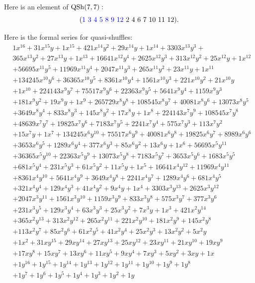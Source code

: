 \begin{Eg}
	Here is an element of $\operatorname{QSh}(7,7):$
	\[
	({\color{blue}1~3~4~5~8~9~12}~2~4~6~7~10~11~12).
	\]
\end{Eg}
Here is the formal series for quasi-shuffles:
\begin{align*}
	&1x^{16} + 31x^{15}y + 1x^{15} + 421x^{14}y^2 + 29x^{14}y + 1x^{14} + 3303x^{13}y^3 + \\
	 &365x^{13}y^2 + 27x^{13}y + 1x^{13} + 16641x^{12}y^4 + 2625x^{12}y^3 + 313x^{12}y^2 + 25x^{12}y + 1x^{12} \\
	  &+ 56695x^{11}y^5 +  11969x^{11}y^4 + 2047x^{11}y^3 + 265x^{11}y^2 + 23x^{11}y + 1x^{11} \\
	  &+ 134245x^{10}y^6 + 36365x^{10}y^5 + 8361x^{10}y^4 + 1561x^{10}y^3 + 221x^{10}y^2 + 21x^{10}y \\
	   &+ 1x^{10} + 224143x^9y^7 + 75517x^9y^6 + 22363x^9y^5 + 5641x^9y^4 + 1159x^9y^3 \\
	   &+ 181x^9y^2 + 19x^9y + 1x^9 + 265729x^8y^8 + 108545x^8y^7 + 40081x^8y^6 + 13073x^8y^5 \\ 
	   &+ 3649x^8y^4 + 833x^8y^3 + 145x^8y^2 + 17x^8y + 1x^8 + 224143x^7y^9 + 108545x^7y^8 \\ 
	   &+ 48639x^7y^7 + 19825x^7y^6 + 7183x^7y^5 + 2241x^7y^4 + 575x^7y^3 + 113x^7y^2 \\ 
	   &+ 15x^7y + 1x^7 + 134245x^6y^{10} + 75517x^6y^9 + 40081x^6y^8 + 19825x^6y^7 + 8989x^6y^6 \\ 
	   &+ 3653x^6y^5 + 1289x^6y^4 + 377x^6y^3 + 85x^6y^2 + 13x^6y + 1x^6 + 56695x^5y^{11} \\ 
	   &+ 36365x^5y^{10} + 22363x^5y^9 + 13073x^5y^8 + 7183x^5y^7 + 3653x^5y^6 + 1683x^5y^5 \\ 
	   &+ 681x^5y^4 + 231x^5y^3 + 61x^5y^2 + 11x^5y + 1x^5 + 16641x^4y^{12} + 11969x^4y^{11} \\
	    &+ 8361x^4y^{10} + 5641x^4y^9 + 3649x^4y^8 + 2241x^4y^7 + 1289x^4y^6 + 681x^4y^5 \\
	     &+ 321x^4y^4 + 129x^4y^3 + 41x^4y^2 + 9x^4y + 1x^4 + 3303x^3y^{13} + 2625x^3y^{12} \\ 
	     &+ 2047x^3y^{11} + 1561x^3y^{10} + 1159x^3y^9 + 833x^3y^8 + 575x^3y^7 + 377x^3y^6 \\
	      &+ 231x^3y^5 + 129x^3y^4 + 63x^3y^3 + 25x^3y^2 + 7x^3y + 1x^3 + 421x^2y^{14} \\
	       &+ 365x^2y^{13} + 313x^2y^{12} + 265x^2y^{11} + 221x^2y^{10} + 181x^2y^9 + 145x^2y^8 \\
	        &+  113x^2y^7 + 85x^2y^6 + 61x^2y^5 + 41x^2y^4 + 25x^2y^3 + 13x^2y^2 + 5x^2y\\
	         &+ 1x^2 + 31xy^{15} + 29xy^{14} + 27xy^{13} + 25xy^{12} + 23xy^{11} + 21xy^{10} + 19xy^9 \\
	         &+ 17xy^8 + 15xy^7 + 13xy^6 + 11xy^5 + 9xy^4 + 7xy^3 + 5xy^2 + 3xy + 1x \\
	           &+ 1y^{16} + 1y^{15} + 1y^{14} + 1y^{13} + 1y^12 + 1y^{11} + 1y^{10} + 1y^9 + 1y^8 \\ 
	           &+ 1y^7 + 1y^6 + 1y^5 + 1y^4 + 1y^3 + 1y^2 + 1y
\end{align*}


